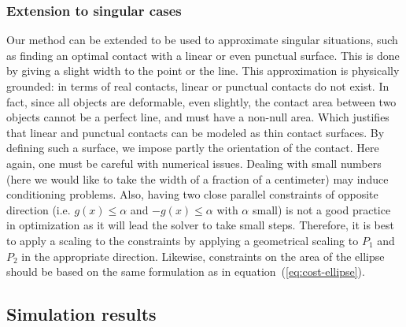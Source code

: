\subsubsection{Extension to singular cases}
\label{subsubsec:singular_cases}
Our method can be extended to be used to approximate singular situations, such as finding an optimal contact with a linear or even punctual surface.
This is done by giving a slight width to the point or the line.
This approximation is physically grounded:
in terms of real contacts, linear or punctual contacts do not exist.
In fact, since all objects are deformable, even slightly, the contact area between two objects cannot be a perfect line, and must have a non-null area.
Which justifies that linear and punctual contacts can be modeled as thin contact surfaces.
By defining such a surface, we impose partly the orientation of the contact.
Here again, one must be careful with numerical issues.
Dealing with small numbers (here we would like to take the width of a fraction of a centimeter) may induce conditioning problems.
Also, having two close parallel constraints of opposite direction (i.e. $g(x)\leq \alpha$ and  $-g(x)\leq \alpha$ with $\alpha$ small) is not a good practice in optimization as it will lead the solver to take small steps.
Therefore, it is best to apply a scaling to the constraints by applying a geometrical scaling to $P_1$ and $P_2$ in the appropriate direction.\newline
Likewise, constraints on the area of the ellipse should be based on the same formulation as in equation~(\ref{eq:cost-ellipse}).



\subsection{Simulation results}
\label{subsec:simu}

